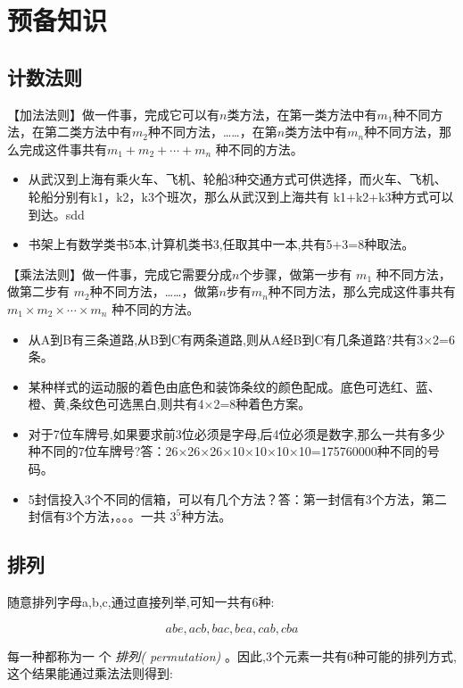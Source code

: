 \section{预备知识}

\subsection{计数法则}

【加法法则】做一件事，完成它可以有$n$类方法，在第一类方法中有$m_{1}$种不同方法，在第二类方法中有$m_{2}$种不同方法，……，在第$n$类方法中有$m_{n}$种不同方法，那么完成这件事共有$m_{1}+m_{2}+\cdots+m_{n}$ 种不同的方法。
\
\begin{itemize}
\item 从武汉到上海有乘火车、飞机、轮船3种交通方式可供选择，而火车、飞机、轮船分别有k1，k2，k3个班次，那么从武汉到上海共有 k1+k2+k3种方式可以到达。sdd 
\item 书架上有数学类书5本,计算机类书3,任取其中一本,共有5+3=8种取法。
\end{itemize}

【乘法法则】做一件事，完成它需要分成$n$个步骤，做第一步有 $m_{1}$ 种不同方法，做第二步有 $m_{2}$种不同方法，……，做第$n$步有$m_{n}$种不同方法，那么完成这件事共有$m_{1} \times m_{2} \times  \cdots \times m_{n}$ 种不同的方法。

\begin{itemize}
\item 从A到B有三条道路,从B到C有两条道路,则从A经B到C有几条道路?共有3×2=6条。
\item 某种样式的运动服的着色由底色和装饰条纹的颜色配成。底色可选红、蓝、橙、黄,条纹色可选黑白,则共有4×2=8种着色方案。

\item 对于7位车牌号,如果要求前3位必须是字母,后4位必须是数字,那么一共有多少种不同的7位车牌号?答：26×26×26×10×10×10×10=175760000种不同的号码。

\item 5封信投入3个不同的信箱，可以有几个方法？答：第一封信有3个方法，第二封信有3个方法，。。。一共 $3^{5}$种方法。

\end{itemize}


\subsection{排列}
随意排列字母a,b,c,通过直接列举,可知一共有6种:

\[
abe,acb,bac,bea,cab,cba 
\]

每一种都称为一 个\textit{ 排列( permutation)} 。因此,3个元素一共有6种可能的排列方式,这个结果能通过乘法法则得到:

